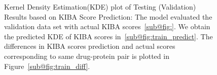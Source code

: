 \begin{figure}[H]
     \qquad
         \qquad
    \caption[Testing Results on KIBA score Prediction]{
        Kernel Density Estimation(KDE) plot of Testing (Validation) Results based on KIBA Score Prediction: The model evaluated the validation data set with actual KIBA scores~\ref{sub@fig:}. We obtain the predicted KDE of KIBA scores in~\ref{sub@fig:train_predict}. The differences in KIBA scores prediction and actual scores corresponding to same drug-protein pair is plotted in Figure~\ref{sub@fig:train_diff}.
    }
    \label{fig:val_train}
\end{figure}

